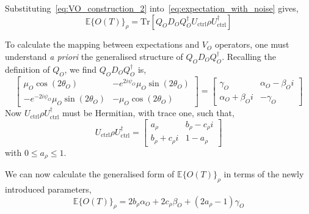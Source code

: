 \documentclass[12pt]{iopart}
\begin{document}
Substituting~\cref{eq:VO_construction_2} into~\cref{eq:expectation_with_noise} gives,
\begin{equation}
    \label{eq:expectationWithNoise3}
    \mathbb{E}\{O(T)\}_\rho = \mathrm{Tr}\left[Q_{O}D_{O}Q_{O}^{\dagger} U_{\mathrm{ctrl}} \rho U_{\mathrm{ctrl}}^{\dagger}\right]
\end{equation}

To calculate the mapping between expectations and $V_{O}$ operators, one must understand \textit{a priori} the generalised structure of $Q_{O}D_{O}Q_{O}^{\dagger}$. Recalling the definition of $Q_O$, we find $ Q_{O}D_{O}Q_{O}^{\dagger}$ is,
\begin{equation}
    \left[ \begin{array}{cc}
            \mu_O\cos(2\theta_O)
             &
            -e^{2i\psi_O}\mu_O\sin(2\theta_O)
            \\
            -e^{-2i\psi_O}\mu_O\sin(2\theta_O)
             &
            -\mu_O\cos(2\theta_O)
        \end{array} \right] = \left[ \begin{array}{cc}
            \gamma_O             & \alpha_O - \beta_O i \\
            \alpha_O + \beta_O i & -\gamma_O
        \end{array} \right]   \label{eq:QDQDagger}
\end{equation}
Now $U_{\mathrm{ctrl}} \rho U_{\mathrm{ctrl}}^{\dagger}$ must be Hermitian, with trace one, such that,
\begin{equation}
    U_{\mathrm{ctrl}} \rho U_{\mathrm{ctrl}}^{\dagger} = \left[\begin{array}{cc}
            a_{\rho}             & b_{\rho} - c_{\rho}i \\
            b_{\rho} + c_{\rho}i & 1 - a_{\rho}
        \end{array}\right] \label{eq:uctrl_rho_uctrl_dag}
\end{equation}
with $0 \leq a_{\rho} \leq 1$.

We can now calculate the generalised form of $\mathbb{E}\{O(T)\}_\rho$ in terms of the newly introduced parameters,
\begin{equation}
    \mathbb{E}\{O(T)\}_\rho = 2 b_{\rho} \alpha_{O}  + 2 c_{\rho} \beta_{O} + (2a_{\rho} - 1)\gamma_{O} \label{eq:expectation_as_function_of_parameters}
\end{equation}
\end{document}
